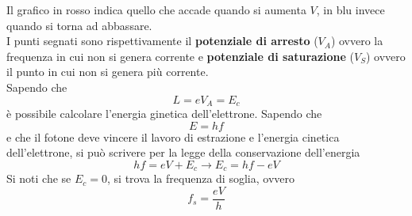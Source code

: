 \begin{center}
\end{center}
Il grafico in rosso indica quello che accade quando si aumenta $V$, in blu invece quando si torna
ad abbassare.\\
I punti segnati sono rispettivamente il \textbf{potenziale di arresto} ($V_A$) ovvero la frequenza
in cui non si genera corrente e \textbf{potenziale di saturazione} ($V_S$) ovvero il punto in cui
non si genera più corrente.\\
Sapendo che
\begin{equation*}
  L = eV_A = E_c
\end{equation*}
è possibile calcolare l'energia ginetica dell'elettrone. Sapendo che
\begin{equation*}
  E=hf
\end{equation*}
e che il fotone deve vincere il lavoro di estrazione e l'energia cinetica dell'elettrone, si può
scrivere per la legge della conservazione dell'energia
\begin{equation*}
  hf=eV+E_c \rightarrow E_c=hf-eV
\end{equation*}
Si noti che se $E_c=0$, si trova la frequenza di soglia, ovvero
\begin{equation*}
  f_s = \frac{eV}{h}
\end{equation*}

